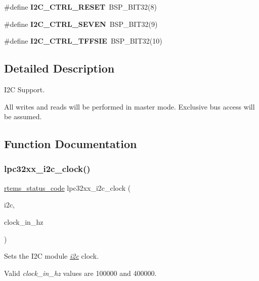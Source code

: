 \begin{DoxyCompactItemize}
\#define {\bfseries I2\+C\+\_\+\+C\+T\+R\+L\+\_\+\+R\+E\+S\+ET}~B\+S\+P\+\_\+\+B\+I\+T32(8)
\item 
\mbox{\label{group__lpc32xx__i2c_gac2a72f543f584da19d6df9baf699d1b2}} 
\#define {\bfseries I2\+C\+\_\+\+C\+T\+R\+L\+\_\+\+S\+E\+V\+EN}~B\+S\+P\+\_\+\+B\+I\+T32(9)
\item 
\mbox{\label{group__lpc32xx__i2c_ga5f0c888f0baf7b6e2c39ac455198a5c3}} 
\#define {\bfseries I2\+C\+\_\+\+C\+T\+R\+L\+\_\+\+T\+F\+F\+S\+IE}~B\+S\+P\+\_\+\+B\+I\+T32(10)
\end{DoxyCompactItemize}


\subsection{Detailed Description}
I2C Support. 

All writes and reads will be performed in master mode. Exclusive bus access will be assumed. 

\subsection{Function Documentation}
\mbox{\label{group__lpc32xx__i2c_gae01a777a930c867e069dd94a377532a0}} 
\subsubsection{\texorpdfstring{lpc32xx\_i2c\_clock()}{lpc32xx\_i2c\_clock()}}
{\footnotesize\ttfamily \mbox{\hyperlink{group__ClassicStatus_ga545d41846817eaba6143d52ee4d9e9fe}{rtems\+\_\+status\+\_\+code}} lpc32xx\+\_\+i2c\+\_\+clock (\begin{DoxyParamCaption}\item[{volatile \mbox{\hyperlink{structlpc32xx__i2c}{lpc32xx\+\_\+i2c}} $\ast$}]{i2c,  }\item[{unsigned}]{clock\+\_\+in\+\_\+hz }\end{DoxyParamCaption})}



Sets the I2C module {\itshape \mbox{\hyperlink{structi2c}{i2c}}} clock. 

Valid {\itshape clock\+\_\+in\+\_\+hz} values are 100000 and 400000.


